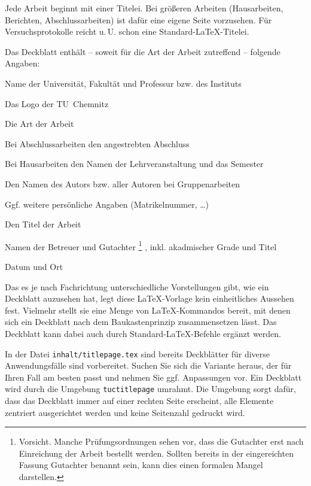 Jede Arbeit beginnt mit einer Titelei. Bei größeren Arbeiten
(Hausarbeiten, Berichten, Abschlussarbeiten) ist dafür eine eigene Seite
vorzusehen. Für Versuchsprotokolle reicht u.\,U. schon eine
Standard-\LaTeX-Titelei.

Das Deckblatt enthält -- soweit für die Art der Arbeit zutreffend --
folgende Angaben:

\begin{compactitem}
\item Name der Universität, Fakultät und Professur bzw. des Instituts
\item Das Logo der TU~Chemnitz
\item Die Art der Arbeit
\item Bei Abschlussarbeiten den angestrebten Abschluss
\item Bei Hausarbeiten den Namen der Lehrveranstaltung und das Semester
\item Den Namen des Autors bzw. aller Autoren bei Gruppenarbeiten
\item Ggf. weitere persönliche Angaben (Matrikelnummer, \dots)
\item Den Titel der Arbeit
\item Namen der Betreuer und Gutachter%
      \footnote{Vorsicht. Manche Prüfungsordnungen sehen vor, dass die
                Gutachter erst nach Einreichung der Arbeit bestellt werden.
		Sollten bereits in der eingereichten Fassung Gutachter benannt
		sein, kann dies einen formalen Mangel darstellen.}%
      , inkl. akadmischer Grade und Titel
\item Datum und Ort
\end{compactitem}

Das es je nach Fachrichtung unterschiedliche Vorstellungen gibt, wie ein
Deckblatt auzusehen hat, legt diese \LaTeX-Vorlage kein einheitliches Aussehen
fest. Vielmehr stellt sie eine Menge von \LaTeX-Kommandos bereit, mit denen
sich ein Deckblatt nach dem Baukastenprinzip zusammensetzen lässt. Das
Deckblatt kann dabei auch durch Standard-\LaTeX-Befehle ergänzt werden.

In der Datei \texttt{inhalt/titlepage.tex} sind bereits Deckblätter für diverse
Anwendungsfälle sind vorbereitet. Suchen Sie sich die Variante heraus, der
für Ihren Fall am besten passt und nehmen Sie ggf. Anpassungen vor. Ein
Deckblatt wird durch die Umgebung \texttt{tuctitlepage} umrahmt. Die Umgebung
sorgt dafür, dass das Deckblatt immer auf einer rechten Seite erscheint, alle
Elemente zentriert ausgerichtet werden und keine Seitenzahl gedruckt wird.

